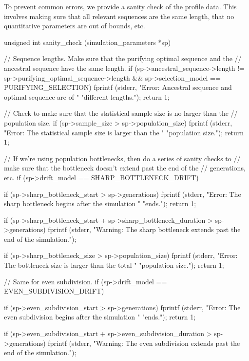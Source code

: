 \documentclass{article}
\begin{document}
     To prevent common errors, we provide a sanity check of the profile data.
     This involves making sure that all relevant sequences are the same length,
     that no quantitative parameters are out of bounds, etc.

\begin{ccode}
unsigned int sanity_check (simulation_parameters *sp) {
  // Sequence lengths. Make sure that the purifying optimal sequence and the
  // ancestral sequence have the same length.
  if (sp->ancestral_sequence->length != sp->purifying_optimal_sequence->length &&
      sp->selection_model == PURIFYING_SELECTION) {
    fprintf (stderr, "Error: Ancestral sequence and optimal sequence are of "
                 "different lengths.\n");
    return 1;
  }

  // Check to make sure that the statistical sample size is no larger than the
  // population size.
  if (sp->sample_size > sp->population_size) {
    fprintf (stderr, "Error: The statistical sample size is larger than the "
                 "population size.\n");
    return 1;
  }

  // If we're using population bottlenecks, then do a series of sanity checks to
  // make sure that the bottleneck doesn't extend past the end of the
  // generations, etc.
  if (sp->drift_model == SHARP_BOTTLENECK_DRIFT) {
    if (sp->sharp_bottleneck_start > sp->generations) {
      fprintf (stderr, "Error: The sharp bottleneck begins after the simulation "
                   "ends.\n");
      return 1;
    }

    if (sp->sharp_bottleneck_start + sp->sharp_bottleneck_duration > sp->generations)
      fprintf (stderr, "Warning: The sharp bottleneck extends past the end of the simulation.\n");

    if (sp->sharp_bottleneck_size > sp->population_size) {
      fprintf (stderr, "Error: The bottleneck size is larger than the total "
                   "population size.\n");
      return 1;
    }
  }

  // Same for even subdivision.
  if (sp->drift_model == EVEN_SUBDIVISION_DRIFT) {
    if (sp->even_subdivision_start > sp->generations) {
      fprintf (stderr, "Error: The even subdivision begins after the simulation "
                   "ends.\n");
      return 1;
    }

    if (sp->even_subdivision_start + sp->even_subdivision_duration > sp->generations)
      fprintf (stderr, "Warning: The even subdivision extends past the end of the simulation.\n");

}}
\end{ccode}
\end{document}
